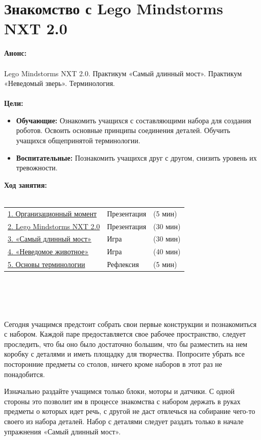 \chapter{Знакомство с  Lego Mindstorms NXT 2.0}
{\bfseries Анонс:}\\\\
Lego Mindstorms NXT 2.0. Практикум «Самый длинный мост». Практикум «Неведомый зверь». Терминология.\\\\
{\bfseries Цели:}
\begin{itemize}
	\item{}{\bfseries Обучающие:} Ознакомить учащихся с составляющими набора для создания роботов. Освоить  основные принципы соединения деталей. Обучить учащихся общепринятой терминологии.
	\item{}{\bfseries Воспитательные:} Познакомить учащихся друг с другом, снизить уровень их тревожности.\\
\end{itemize}	
{\bfseries Ход занятия:}\\\\
\begin{tabular}{lll}
	\hyperlink{lesson2x1}{1. Организационный момент} & Презентация & (5 мин)\\
	\hyperlink{lesson2x2}{2. Lego Mindstorms NXT 2.0} & Презентация & (30 мин) \\
	\hyperlink{lesson2x3}{3. «Самый длинный мост»} & Игра & (30 мин) \\
	\hyperlink{lesson2x4}{4. «Неведомое животное»} & Игра & (40 мин)\\
	\hyperlink{lesson2x5}{5. Основы терминологии} & Рефлексия & (5 мин)\\
\end{tabular}\\\\

{\hypertarget{lesson2x1}{}}\\\\

Сегодня учащимся предстоит собрать свои первые конструкции и познакомиться с набором. Каждой паре предоставляется свое рабочее пространство, следует проследить, что бы оно было достаточно большим, что бы разместить на нем коробку с деталями и иметь площадку для творчества. Попросите убрать все посторонние предметы со столов, ничего кроме наборов в этот раз не понадобится.

Изначально раздайте учащимся только блоки, моторы и датчики. С одной стороны это позволит им в процессе знакомства с набором держать в руках предметы о которых идет речь, с другой не даст отвлечься на собирание чего-то своего из набора деталей. Набор с деталями следует раздать только в начале упражнения «Самый длинный мост».\\\\

